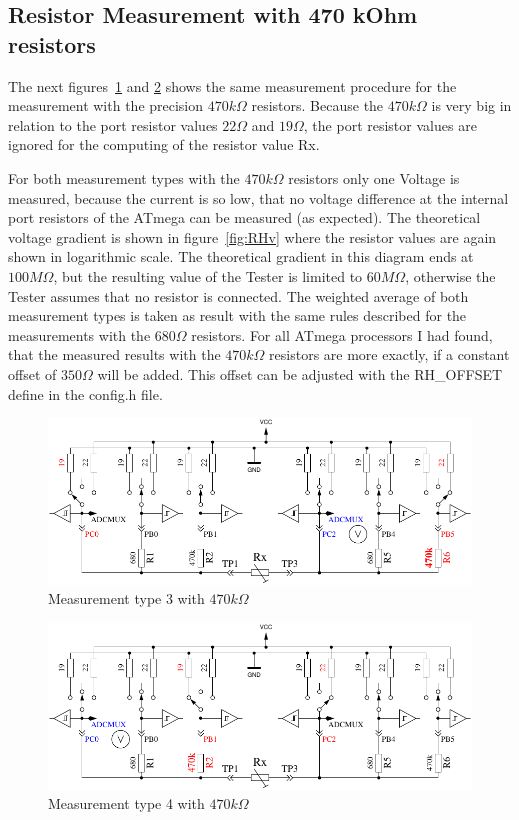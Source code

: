 \subsection{Resistor Measurement with 470 kOhm resistors}
The next figures~\ref{fig:RH1mes} and \ref{fig:RH2mes} shows the same measurement procedure for the
measurement with the precision \(470k\Omega\) resistors. Because the \(470k\Omega\) is very big in relation
to the port resistor values \(22\Omega\) and \(19\Omega\), the port resistor values are ignored for the computing
of the resistor value Rx.

For both measurement types with the \(470k\Omega\) resistors only one Voltage is measured, because the current
is so low, that no voltage difference at the internal port resistors of the ATmega can be measured (as expected).
The theoretical voltage gradient is shown in figure~\ref{fig:RHv} where the resistor values are again shown in logarithmic scale.
The theoretical gradient in this diagram ends at \(100M\Omega\), but the resulting value of the Tester is
limited to \(60M\Omega\), otherwise the Tester assumes that no resistor is connected.
The weighted average of both measurement types is taken as result with the same rules described for the measurements with the \(680\Omega\) resistors.
For all ATmega processors I had found, that the measured results with the \(470k\Omega\) resistors are more exactly,
if a constant offset of \(350\Omega\) will be added.
This offset can be adjusted with the RH\_OFFSET define in the config.h file.

\begin{figure}[H]
\centering
\includegraphics[]{../FIG/ResistormessH1.pdf}
\caption{Measurement type 3 with \(470k\Omega\) }
\label{fig:RH1mes}
\end{figure}

\begin{figure}[H]
 \centering
 \includegraphics[]{../FIG/ResistormessH2.pdf}
 \caption{Measurement type 4 with \(470k\Omega\) }
\label{fig:RH2mes}
\end{figure}

